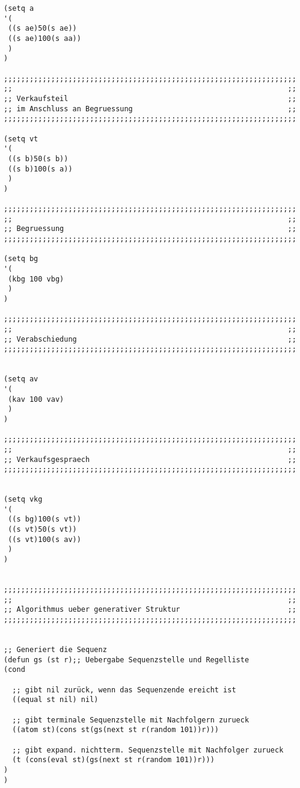 \documentclass[12pt]{article}
\begin{document}
\begin{verbatim}
(setq a
'(
 ((s ae)50(s ae))
 ((s ae)100(s aa))
 )
)

;;;;;;;;;;;;;;;;;;;;;;;;;;;;;;;;;;;;;;;;;;;;;;;;;;;;;;;;;;;;;;;;;;;;
;;                                                                ;;
;; Verkaufsteil                                                   ;;
;; im Anschluss an Begruessung                                    ;;
;;;;;;;;;;;;;;;;;;;;;;;;;;;;;;;;;;;;;;;;;;;;;;;;;;;;;;;;;;;;;;;;;;;;

(setq vt
'(
 ((s b)50(s b))
 ((s b)100(s a))
 )
)

;;;;;;;;;;;;;;;;;;;;;;;;;;;;;;;;;;;;;;;;;;;;;;;;;;;;;;;;;;;;;;;;;;;;
;;                                                                ;;
;; Begruessung                                                    ;;
;;;;;;;;;;;;;;;;;;;;;;;;;;;;;;;;;;;;;;;;;;;;;;;;;;;;;;;;;;;;;;;;;;;;

(setq bg
'(
 (kbg 100 vbg)
 )
)

;;;;;;;;;;;;;;;;;;;;;;;;;;;;;;;;;;;;;;;;;;;;;;;;;;;;;;;;;;;;;;;;;;;;
;;                                                                ;;
;; Verabschiedung                                                 ;;
;;;;;;;;;;;;;;;;;;;;;;;;;;;;;;;;;;;;;;;;;;;;;;;;;;;;;;;;;;;;;;;;;;;;


(setq av
'(
 (kav 100 vav)
 )
)

;;;;;;;;;;;;;;;;;;;;;;;;;;;;;;;;;;;;;;;;;;;;;;;;;;;;;;;;;;;;;;;;;;;;
;;                                                                ;;
;; Verkaufsgespraech                                              ;;
;;;;;;;;;;;;;;;;;;;;;;;;;;;;;;;;;;;;;;;;;;;;;;;;;;;;;;;;;;;;;;;;;;;;


(setq vkg
'(
 ((s bg)100(s vt))
 ((s vt)50(s vt))
 ((s vt)100(s av))
 )
)


;;;;;;;;;;;;;;;;;;;;;;;;;;;;;;;;;;;;;;;;;;;;;;;;;;;;;;;;;;;;;;;;;;;;
;;                                                                ;;
;; Algorithmus ueber generativer Struktur                         ;;
;;;;;;;;;;;;;;;;;;;;;;;;;;;;;;;;;;;;;;;;;;;;;;;;;;;;;;;;;;;;;;;;;;;;


;; Generiert die Sequenz
(defun gs (st r);; Uebergabe Sequenzstelle und Regelliste 
(cond

  ;; gibt nil zurück, wenn das Sequenzende ereicht ist
  ((equal st nil) nil)

  ;; gibt terminale Sequenzstelle mit Nachfolgern zurueck 
  ((atom st)(cons st(gs(next st r(random 101))r)))
      
  ;; gibt expand. nichtterm. Sequenzstelle mit Nachfolger zurueck
  (t (cons(eval st)(gs(next st r(random 101))r)))       
)
)


\end{verbatim}
\end{document}
